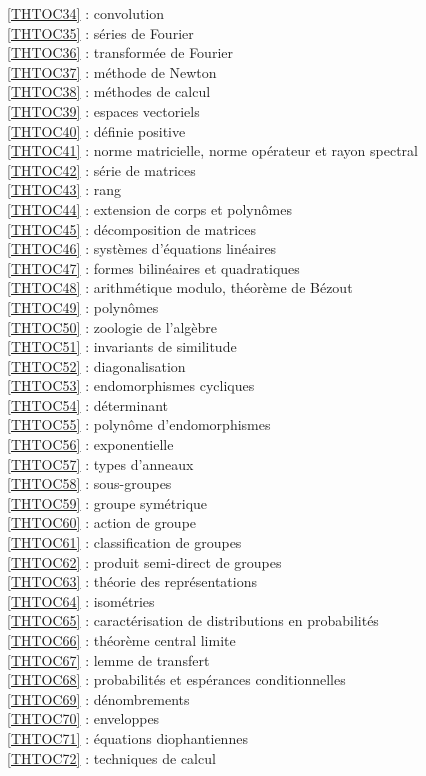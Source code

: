 \ref {THTOC34} : convolution\\
\ref {THTOC35} : séries de Fourier\\
\ref {THTOC36} : transformée de Fourier\\
\ref {THTOC37} : méthode de Newton\\
\ref {THTOC38} : méthodes de calcul\\
\ref {THTOC39} : espaces vectoriels\\
\ref {THTOC40} : définie positive\\
\ref {THTOC41} : norme matricielle, norme opérateur et rayon spectral\\
\ref {THTOC42} : série de matrices\\
\ref {THTOC43} : rang\\
\ref {THTOC44} : extension de corps et polynômes\\
\ref {THTOC45} : décomposition de matrices\\
\ref {THTOC46} : systèmes d'équations linéaires\\
\ref {THTOC47} : formes bilinéaires et quadratiques\\
\ref {THTOC48} : arithmétique modulo, théorème de Bézout\\
\ref {THTOC49} : polynômes\\
\ref {THTOC50} : zoologie de l'algèbre\\
\ref {THTOC51} : invariants de similitude\\
\ref {THTOC52} : diagonalisation\\
\ref {THTOC53} : endomorphismes cycliques\\
\ref {THTOC54} : déterminant\\
\ref {THTOC55} : polynôme d'endomorphismes\\
\ref {THTOC56} : exponentielle\\
\ref {THTOC57} : types d'anneaux\\
\ref {THTOC58} : sous-groupes\\
\ref {THTOC59} : groupe symétrique\\
\ref {THTOC60} : action de groupe\\
\ref {THTOC61} : classification de groupes\\
\ref {THTOC62} : produit semi-direct de groupes\\
\ref {THTOC63} : théorie des représentations\\
\ref {THTOC64} : isométries\\
\ref {THTOC65} : caractérisation de distributions en probabilités\\
\ref {THTOC66} : théorème central limite\\
\ref {THTOC67} : lemme de transfert\\
\ref {THTOC68} : probabilités et espérances conditionnelles\\
\ref {THTOC69} : dénombrements\\
\ref {THTOC70} : enveloppes\\
\ref {THTOC71} : équations diophantiennes\\
\ref {THTOC72} : techniques de calcul\\

